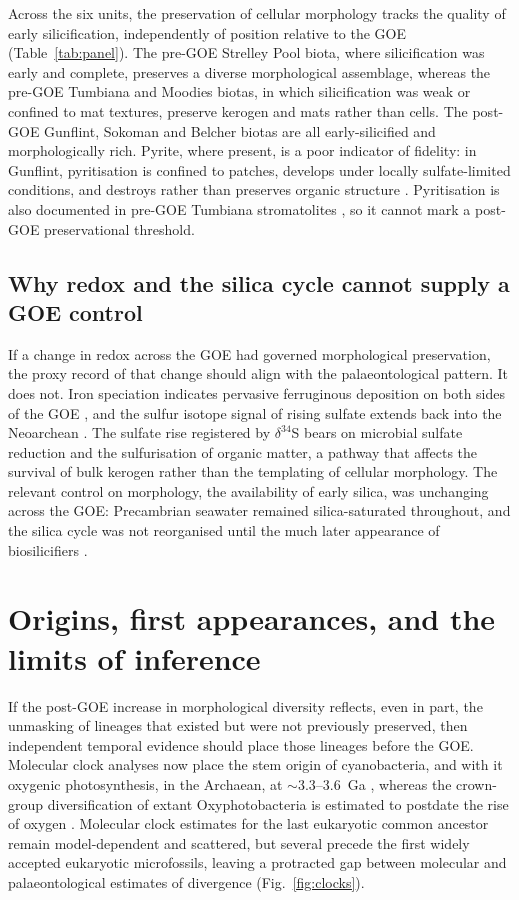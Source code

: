 \documentclass[11pt]{article}
\begin{document}
Across the six units, the preservation of cellular morphology tracks the quality of early
silicification, independently of position relative to the GOE (Table~\ref{tab:panel}). The
pre-GOE Strelley Pool biota, where silicification was early and complete, preserves a diverse
morphological assemblage, whereas the pre-GOE Tumbiana and Moodies biotas, in which silicification
was weak or confined to mat textures, preserve kerogen and mats rather than cells. The post-GOE
Gunflint, Sokoman and Belcher biotas are all early-silicified and morphologically rich. Pyrite, where
present, is a poor indicator of fidelity: in Gunflint, pyritisation is confined to patches, develops
under locally sulfate-limited conditions, and destroys rather than preserves organic structure
\citep{Wacey2013,Lepot2017}. Pyritisation is also documented in pre-GOE Tumbiana stromatolites
\citep{Decreane2021}, so it cannot mark a post-GOE preservational threshold.

\subsection{Why redox and the silica cycle cannot supply a GOE control}

If a change in redox across the GOE had governed morphological preservation, the proxy record of that
change should align with the palaeontological pattern. It does not. Iron speciation indicates
pervasive ferruginous deposition on both sides of the GOE \citep{Poulton2011}, and the sulfur
isotope signal of rising sulfate extends back into the Neoarchean \citep{Reinhard2009,Philippot2018}.
The sulfate rise registered by $\delta^{34}$S bears on microbial sulfate reduction and the
sulfurisation of organic matter, a pathway that affects the survival of bulk kerogen rather than the
templating of cellular morphology. The relevant control on morphology, the availability of early
silica, was unchanging across the GOE: Precambrian seawater remained silica-saturated throughout, and
the silica cycle was not reorganised until the much later appearance of biosilicifiers
\citep{Siever1992,Perry2003}.

\section{Origins, first appearances, and the limits of inference}

If the post-GOE increase in morphological diversity reflects, even in part, the unmasking of lineages
that existed but were not previously preserved, then independent temporal evidence should place
those lineages before the GOE. Molecular clock analyses now place the stem origin of cyanobacteria,
and with it oxygenic photosynthesis, in the Archaean, at $\sim$3.3--3.6~Ga \citep{Sanchez2021},
whereas the crown-group diversification of extant Oxyphotobacteria is estimated to postdate the rise
of oxygen \citep{Shih2017}. Molecular clock estimates for the last eukaryotic common ancestor remain
model-dependent and scattered, but several precede the first widely accepted eukaryotic
microfossils, leaving a protracted gap between molecular and palaeontological estimates of
divergence \citep{Betts2018,Eme2014} (Fig.~\ref{fig:clocks}).
\end{document}
